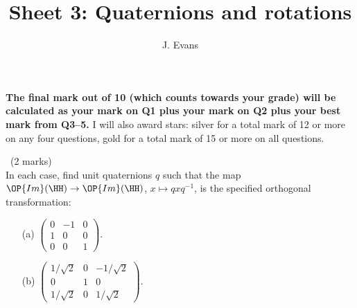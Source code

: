 \documentclass[12pt]{article}
\title{Sheet 3: Quaternions and rotations}
\author{J. Evans}
\date{}
\begin{document}
\maketitle

\bigskip

{\bf The final mark out of 10 (which counts towards your grade) will be calculated as your mark on Q1 plus your mark on Q2 plus your best mark from Q3--5.} I will also award stars: silver for a total mark of 12 or more on any four questions, gold for a total mark of 15 or more on all questions. 

\vspace{1cm}

\begin{question}\ (2 marks)\\
  In each case, find unit quaternions $q$ such that the map $\OP{Im}(\HH)\to\OP{Im}(\HH)$, $x\mapsto qxq^{-1}$, is the specified orthogonal transformation:
  \begin{enumerate}
  \item[(a)] $\left(\begin{array}{ccc}0 & -1 & 0\\ 1 & 0 & 0\\ 0 & 0 & 1\end{array}\right)$.
  \item[(b)] $\left(\begin{array}{ccc}1/\sqrt{2} & 0 & -1/\sqrt{2}\\ 0 & 1 & 0\\ 1/\sqrt{2} & 0 & 1/\sqrt{2}\end{array}\right)$.
  \end{enumerate}
\end{question}

\iffalse
\begin{answer}
  \begin{enumerate}
  \item[(a)] This first matrix is a $\pi/2$-rotation around the $z$-axis, so should be effected by the quaternion $\cos(\pi/4)+k\sin(\pi/4)=\frac{1}{\sqrt{2}}(1+k)$. We can check that this is indeed the case:
    \begin{align*}
      \frac{1}{\sqrt{2}}(1+k)(ix+jy+kz)\frac{1}{\sqrt{2}}(1-k)&=\frac{1}{2}((i+j)x+(j-i)y+(k-1)z)(1-k)\\
      &=\frac{1}{2}((i+j+j-i)x+(j-i-i-j)y+(k-1+1+k)z)\\
      &=-iy+jx+kz
    \end{align*}
    so $(1,0,0)$ is sent to $(0,1,0)$, $(0,1,0)$ is sent to $(-1,0,0)$ and $(0,0,1)$ is sent to $(0,0,1)$, as required.
  \item[(b)] This matrix corresponds to a $-\pi/4$-rotation around the $y$-axis, so should be effected by the quaternion $\cos(\pi/8)-j\sin(\pi/8)$.
  \end{enumerate}
\end{answer}
\newpage
\fi
\end{document}
